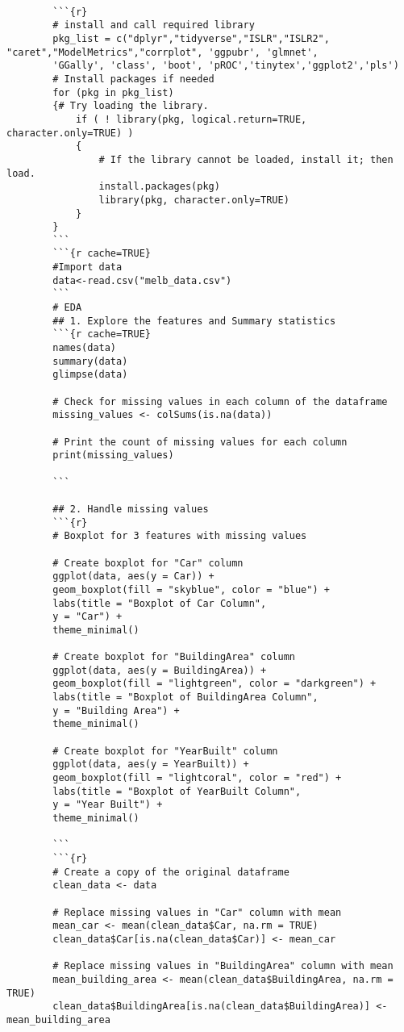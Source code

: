 \documentclass[12pt,doublespace]{article}
\begin{document}
	\begin{lstlisting}
		
		```{r}
		# install and call required library
		pkg_list = c("dplyr","tidyverse","ISLR","ISLR2", "caret","ModelMetrics","corrplot", 'ggpubr', 'glmnet',
		'GGally', 'class', 'boot', 'pROC','tinytex','ggplot2','pls')
		# Install packages if needed
		for (pkg in pkg_list)
		{# Try loading the library.
			if ( ! library(pkg, logical.return=TRUE, character.only=TRUE) )
			{
				# If the library cannot be loaded, install it; then load.
				install.packages(pkg)
				library(pkg, character.only=TRUE)
			}
		}
		```
		```{r cache=TRUE}
		#Import data
		data<-read.csv("melb_data.csv")
		```
		# EDA
		## 1. Explore the features and Summary statistics
		```{r cache=TRUE}
		names(data)
		summary(data)
		glimpse(data)
		
		# Check for missing values in each column of the dataframe
		missing_values <- colSums(is.na(data))
		
		# Print the count of missing values for each column
		print(missing_values)
		
		```
		
		## 2. Handle missing values
		```{r}
		# Boxplot for 3 features with missing values
		
		# Create boxplot for "Car" column
		ggplot(data, aes(y = Car)) +
		geom_boxplot(fill = "skyblue", color = "blue") +
		labs(title = "Boxplot of Car Column",
		y = "Car") +
		theme_minimal()
		
		# Create boxplot for "BuildingArea" column
		ggplot(data, aes(y = BuildingArea)) +
		geom_boxplot(fill = "lightgreen", color = "darkgreen") +
		labs(title = "Boxplot of BuildingArea Column",
		y = "Building Area") +
		theme_minimal()
		
		# Create boxplot for "YearBuilt" column
		ggplot(data, aes(y = YearBuilt)) +
		geom_boxplot(fill = "lightcoral", color = "red") +
		labs(title = "Boxplot of YearBuilt Column",
		y = "Year Built") +
		theme_minimal()
		
		```
		```{r}
		# Create a copy of the original dataframe
		clean_data <- data
		
		# Replace missing values in "Car" column with mean
		mean_car <- mean(clean_data$Car, na.rm = TRUE)
		clean_data$Car[is.na(clean_data$Car)] <- mean_car
		
		# Replace missing values in "BuildingArea" column with mean
		mean_building_area <- mean(clean_data$BuildingArea, na.rm = TRUE)
		clean_data$BuildingArea[is.na(clean_data$BuildingArea)] <- mean_building_area 
		

\end{lstlisting}
\end{document}
